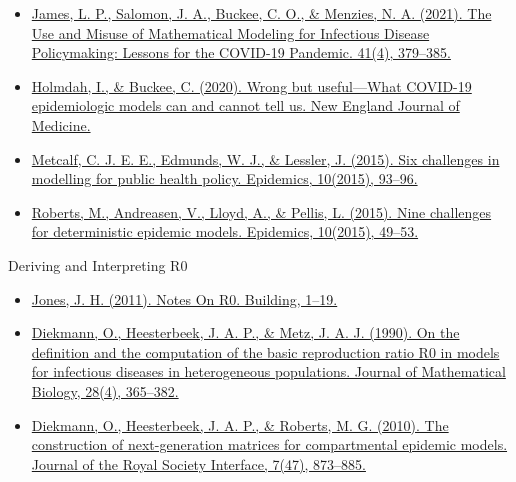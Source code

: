 \documentclass[
  ignorenonframetext,
]{beamer}
\providecommand{\tightlist}{%
  \setlength{\itemsep}{0pt}\setlength{\parskip}{0pt}}\usepackage{longtable,booktabs,array}
\begin{document}
\begin{frame}
\begin{itemize}
\tightlist
\item
  \href{https://doi.org/10.1177/0272989X21990391}{James, L. P., Salomon,
  J. A., Buckee, C. O., \& Menzies, N. A. (2021). The Use and Misuse of
  Mathematical Modeling for Infectious Disease Policymaking: Lessons for
  the COVID-19 Pandemic. 41(4), 379--385.}
\item
  \href{https://doi.org/10.1056/nejmp2009027}{Holmdah, I., \& Buckee, C.
  (2020). Wrong but useful---What COVID-19 epidemiologic models can and
  cannot tell us. New England Journal of Medicine.}
\item
  \href{https://doi.org/10.1016/j.epidem.2014.08.008}{Metcalf, C. J. E.
  E., Edmunds, W. J., \& Lessler, J. (2015). Six challenges in modelling
  for public health policy. Epidemics, 10(2015), 93--96.}
\item
  \href{https://doi.org/10.1016/j.epidem.2014.09.006}{Roberts, M.,
  Andreasen, V., Lloyd, A., \& Pellis, L. (2015). Nine challenges for
  deterministic epidemic models. Epidemics, 10(2015), 49--53.}
\end{itemize}
\end{frame}

\begin{frame}
\begin{block}{Deriving and Interpreting R0}
\label{deriving-and-interpreting-r0}
\begin{itemize}
\tightlist
\item
  \href{https://web.stanford.edu/~jhj1/teachingdocs/Jones-on-R0.pdf}{Jones,
  J. H. (2011). Notes On R0. Building, 1--19.}
\item
  \href{https://doi.org/10.1007/BF00178324}{Diekmann, O., Heesterbeek,
  J. A. P., \& Metz, J. A. J. (1990). On the definition and the
  computation of the basic reproduction ratio R0 in models for
  infectious diseases in heterogeneous populations. Journal of
  Mathematical Biology, 28(4), 365--382.}
\item
  \href{https://doi.org/10.1098/rsif.2009.0386}{Diekmann, O.,
  Heesterbeek, J. A. P., \& Roberts, M. G. (2010). The construction of
  next-generation matrices for compartmental epidemic models. Journal of
  the Royal Society Interface, 7(47), 873--885.}
\end{itemize}
\end{block}
\end{frame}
\end{document}
